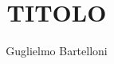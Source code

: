 \documentclass[11pt]{article}
\begin{document}
\title{TITOLO}
\author{Guglielmo Bartelloni}

\maketitle
\tableofcontents
\newpage
\thispagestyle{empty}
\end{document}
